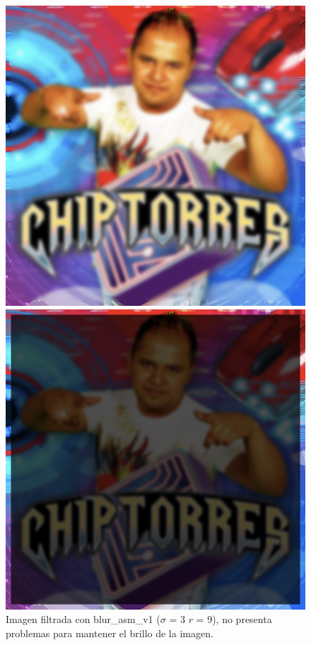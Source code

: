 \begin{figure}[H]
\centering
\begin{minipage}{0.48\textwidth}
  \centering
    \includegraphics[width=1\textwidth]{imgs/chip_hd_v1.jpg}
  \caption{\footnotesize{Imagen filtrada con blur\_asm\_v1 ($\sigma$ = 3 $r$ = 9), no presenta problemas para mantener el brillo de la imagen.}}
  \label{fig:tiempo1}
\end{minipage}%
\hspace{0.03\textwidth}
\begin{minipage}{0.48\textwidth}
  \centering
    \includegraphics[width=1\textwidth]{imgs/chip_hd_ushort.jpg}

\end{minipage}
\end{figure}
